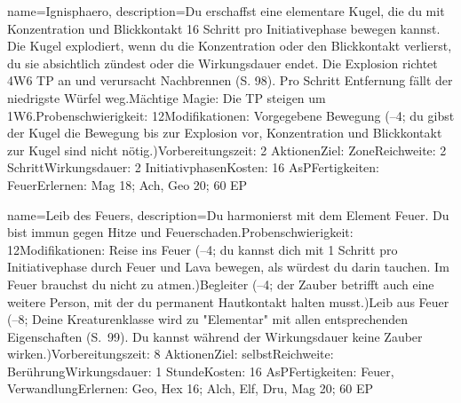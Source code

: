 {
    name={Ignisphaero},
    description={Du erschaffst eine elementare Kugel, die du mit Konzentration und Blickkontakt 16 Schritt pro Initiativephase bewegen kannst. Die Kugel explodiert, wenn du die Konzentration oder den Blickkontakt verlierst, du sie absichtlich zündest oder die Wirkungsdauer endet. Die Explosion richtet 4W6 TP an und verursacht Nachbrennen (S. 98). Pro Schritt Entfernung fällt der niedrigste Würfel weg.\newline Mächtige Magie: Die TP steigen um 1W6.\newline Probenschwierigkeit: 12\newline Modifikationen: Vorgegebene Bewegung (–4; du gibst der Kugel die Bewegung bis zur Explosion vor, Konzentration und Blickkontakt zur Kugel sind nicht nötig.)\newline Vorbereitungszeit: 2 Aktionen\newline Ziel: Zone\newline Reichweite: 2 Schritt\newline Wirkungsdauer: 2 Initiativphasen\newline Kosten: 16 AsP\newline Fertigkeiten: Feuer\newline Erlernen: Mag 18; Ach, Geo 20; 60 EP}
}


{
    name={Leib des Feuers},
    description={Du harmonierst mit dem Element Feuer. Du bist immun gegen Hitze und Feuerschaden.\newline Probenschwierigkeit: 12\newline Modifikationen: Reise ins Feuer (–4; du kannst dich mit 1 Schritt pro Initiativephase durch Feuer und Lava bewegen, als würdest du darin tauchen. Im Feuer brauchst du nicht zu atmen.)\newline Begleiter (–4; der Zauber betrifft auch eine weitere Person, mit der du permanent Hautkontakt halten musst.)\newline Leib aus Feuer (–8; Deine Kreaturenklasse wird zu "Elementar" mit allen entsprechenden Eigenschaften (S. 99). Du kannst während der Wirkungsdauer keine Zauber wirken.)\newline Vorbereitungszeit: 8 Aktionen\newline Ziel: selbst\newline Reichweite: Berührung\newline Wirkungsdauer: 1 Stunde\newline Kosten: 16 AsP\newline Fertigkeiten: Feuer, Verwandlung\newline Erlernen: Geo, Hex 16; Alch, Elf, Dru, Mag 20; 60 EP}
}


